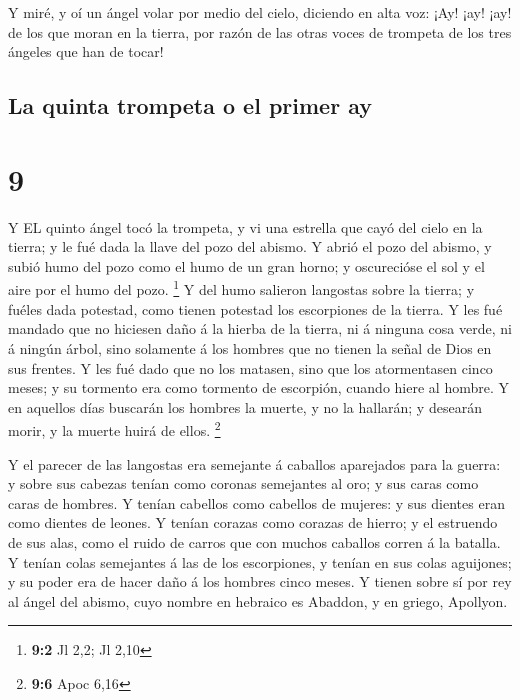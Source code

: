  Y miré, y oí un ángel volar por medio del cielo, diciendo
en alta voz: ¡Ay! ¡ay! ¡ay! de los que moran en la tierra, por razón de
las otras voces de trompeta de los tres ángeles que han de tocar!

\hypertarget{la-quinta-trompeta-o-el-primer-ay}{%
\subsection{La quinta trompeta o el primer
ay}\label{la-quinta-trompeta-o-el-primer-ay}}

\hypertarget{section-8}{%
\section{9}\label{section-8}}

 Y EL quinto ángel tocó la trompeta, y vi una estrella que
cayó del cielo en la tierra; y le fué dada la llave del pozo del abismo.
 Y abrió el pozo del abismo, y subió humo del pozo como el
humo de un gran horno; y oscurecióse el sol y el aire por el humo del
pozo. \footnote{\textbf{9:2} Jl 2,2; Jl 2,10}  Y del humo
salieron langostas sobre la tierra; y fuéles dada potestad, como tienen
potestad los escorpiones de la tierra.  Y les fué mandado
que no hiciesen daño á la hierba de la tierra, ni á ninguna cosa verde,
ni á ningún árbol, sino solamente á los hombres que no tienen la señal
de Dios en sus frentes.  Y les fué dado que no los matasen,
sino que los atormentasen cinco meses; y su tormento era como tormento
de escorpión, cuando hiere al hombre.  Y en aquellos días
buscarán los hombres la muerte, y no la hallarán; y desearán morir, y la
muerte huirá de ellos. \footnote{\textbf{9:6} Apoc 6,16}

 Y el parecer de las langostas era semejante á caballos
aparejados para la guerra: y sobre sus cabezas tenían como coronas
semejantes al oro; y sus caras como caras de hombres.  Y
tenían cabellos como cabellos de mujeres: y sus dientes eran como
dientes de leones.  Y tenían corazas como corazas de hierro;
y el estruendo de sus alas, como el ruido de carros que con muchos
caballos corren á la batalla.  Y tenían colas semejantes á
las de los escorpiones, y tenían en sus colas aguijones; y su poder era
de hacer daño á los hombres cinco meses.  Y tienen sobre sí
por rey al ángel del abismo, cuyo nombre en hebraico es Abaddon, y en
griego, Apollyon.

